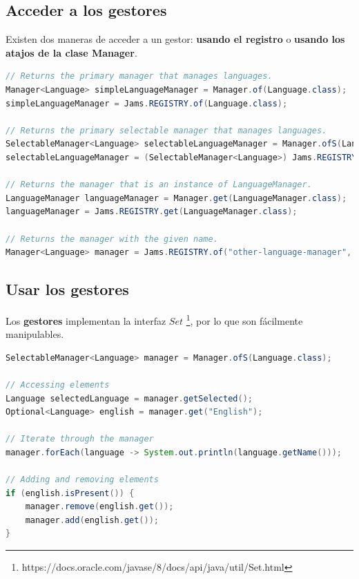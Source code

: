 \subsection{Acceder a los gestores}\label{subsec:acceder-a-los-gestores}

Existen dos maneras de acceder a un gestor: \textbf{usando el registro} o
\textbf{usando los atajos de la clase Manager}.

\begin{lstlisting}[language=Java,style=java,frame=single,label={lst:acceder-a-los-gestores}]
// Returns the primary manager that manages languages.
Manager<Language> simpleLanguageManager = Manager.of(Language.class);
simpleLanguageManager = Jams.REGISTRY.of(Language.class);

// Returns the primary selectable manager that manages languages.
SelectableManager<Language> selectableLanguageManager = Manager.ofS(Language.class);
selectableLanguageManager = (SelectableManager<Language>) Jams.REGISTRY.of(Language.class);

// Returns the manager that is an instance of LanguageManager.
LanguageManager languageManager = Manager.get(LanguageManager.class);
languageManager = Jams.REGISTRY.get(LanguageManager.class);

// Returns the manager with the given name.
Manager<Language> manager = Jams.REGISTRY.of("other-language-manager", Language.class);
\end{lstlisting}

\subsection{Usar los gestores}\label{subsec:usar-los-gestores}

Los \textbf{gestores} implementan la interfaz $Set$
\footnote{https://docs.oracle.com/javase/8/docs/api/java/util/Set.html},
por lo que son fácilmente manipulables.

\begin{lstlisting}[language=Java,style=java,frame=single,label={lst:usar-los-gestores}]
SelectableManager<Language> manager = Manager.ofS(Language.class);

// Accessing elements
Language selectedLanguage = manager.getSelected();
Optional<Language> english = manager.get("English");

// Iterate through the manager
manager.forEach(language -> System.out.println(language.getName()));

// Adding and removing elements
if (english.isPresent()) {
    manager.remove(english.get());
    manager.add(english.get());
}
\end{lstlisting}

